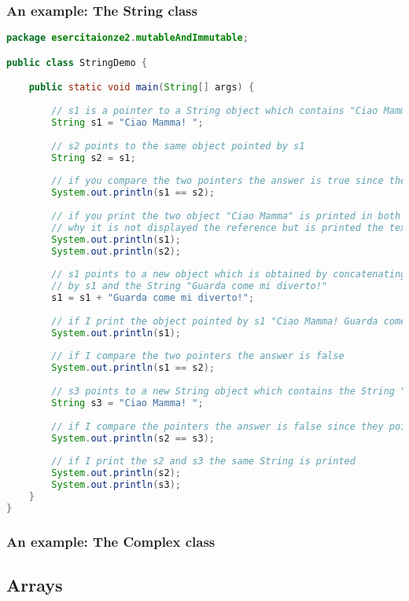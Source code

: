 \documentclass{article}
\begin{document}
\subsubsection{An example: The String class}
\begin{lstlisting}[language=Java,escapechar=|]
package esercitaionze2.mutableAndImmutable;

public class StringDemo {

	public static void main(String[] args) {
		
		// s1 is a pointer to a String object which contains "Ciao Mamma"
		String s1 = "Ciao Mamma! ";
		
		// s2 points to the same object pointed by s1
		String s2 = s1;
		
		// if you compare the two pointers the answer is true since they point to the same object
		System.out.println(s1 == s2);
		
		// if you print the two object "Ciao Mamma" is printed in both the cases 
		// why it is not displayed the reference but is printed the text? we will see...
		System.out.println(s1);
		System.out.println(s2);
		
		// s1 points to a new object which is obtained by concatenating the string pointed
		// by s1 and the String "Guarda come mi diverto!"
		s1 = s1 + "Guarda come mi diverto!";
		
		// if I print the object pointed by s1 "Ciao Mamma! Guarda come mi diverto!" is printed
		System.out.println(s1);
		
		// if I compare the two pointers the answer is false
		System.out.println(s1 == s2);
	
		// s3 points to a new String object which contains the String "Ciao Mamma! "
		String s3 = "Ciao Mamma! ";
		
		// if I compare the pointers the answer is false since they points to different objects
		System.out.println(s2 == s3);
		
		// if I print the s2 and s3 the same String is printed
		System.out.println(s2);
		System.out.println(s3);
	}
}
\end{lstlisting}



\subsubsection{An example: The Complex class}


\subsection{Arrays}


\clearpage







\nocite{*}
\end{document}
